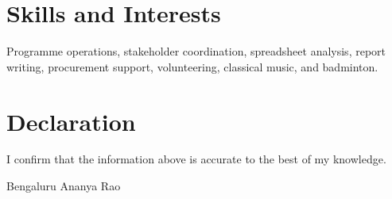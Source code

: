 \documentclass[11pt,a4paper]{article}
\begin{document}
\section{Skills and Interests}
Programme operations, stakeholder coordination, spreadsheet analysis, report
writing, procurement support, volunteering, classical music, and badminton.

\section{Declaration}
I confirm that the information above is accurate to the best of my knowledge.

\vspace{8pt}
\noindent Bengaluru \hfill Ananya Rao
\end{document}
